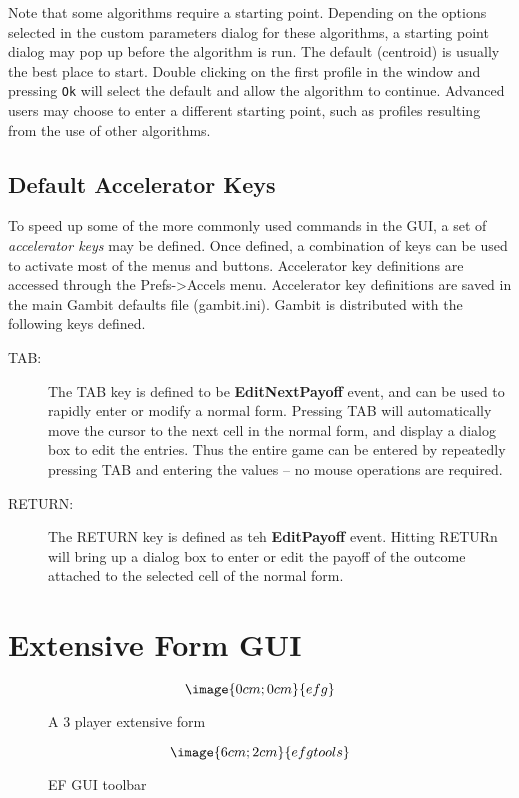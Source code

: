 Note that some algorithms require a starting point.  Depending on the
options selected in the custom parameters dialog for these algorithms,
a starting point dialog may pop up before the algorithm is run.  The
default (centroid) is usually the best place to start.  Double
clicking on the first profile in the window and pressing {\tt Ok} will
select the default and allow the algorithm to continue. Advanced users
may choose to enter a different starting point, such as profiles
resulting from the use of other algorithms.

\section{Default Accelerator Keys}\label{NormFormDefAccl}
To speed up some of the more commonly used commands in the GUI, a set of 
{\em accelerator keys} may be defined.  Once defined, a combination of keys
can be used to activate most of the menus and buttons.  Accelerator key
definitions are accessed through the Prefs->Accels menu.  Accelerator key
definitions are saved in the main Gambit defaults file (gambit.ini).  Gambit
is distributed with the following keys defined.
\begin{description}
\item[TAB:] The TAB key is defined to be {\bf EditNextPayoff} event, and 
can be used to rapidly enter or modify a normal form.  Pressing TAB
will automatically move the cursor to the next cell in the normal
form, and display a dialog box to edit the entries.  Thus the entire
game can be entered by repeatedly pressing TAB and entering the values
-- no mouse operations are required.
\item[RETURN:] The RETURN key is defined as teh {\bf EditPayoff}
event.  Hitting RETURn will bring up a dialog box to enter or edit the
payoff of the outcome attached to the selected cell of the normal
form.
\end{description}

\chapter{Extensive Form GUI}\label{EFGUI}

\begin{figure}
$$\image{0cm;0cm}{efg}$$
\caption{A 3 player extensive form}\label{fig_efg}
\end{figure}

\begin{figure}
$$\image{6cm;2cm}{efgtools}$$
\caption{EF GUI toolbar}\label{fig_efgtools}
\end{figure}

